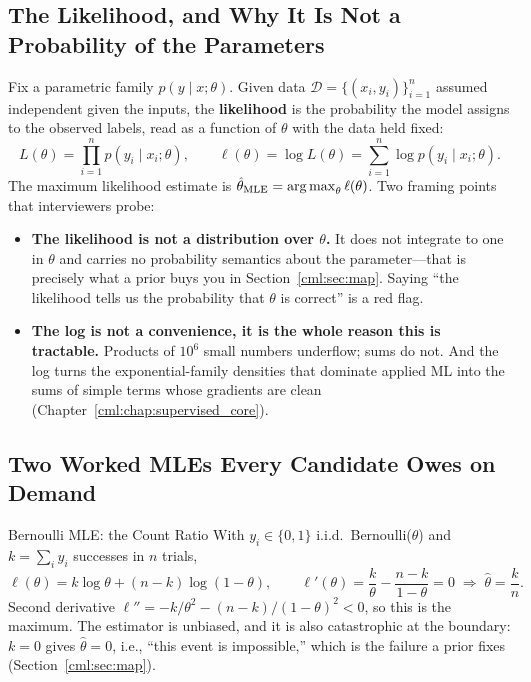 \subsection{The Likelihood, and Why It Is Not a Probability of the Parameters}

Fix a parametric family $p(y \mid x; \theta)$. Given data $\mathcal{D} = \{(x_i, y_i)\}_{i=1}^n$ assumed independent given the inputs, the \textbf{likelihood} is the probability the model assigns to the observed labels, read as a function of $\theta$ with the data held fixed:
\begin{equation}
L(\theta) = \prod_{i=1}^n p(y_i \mid x_i; \theta), \qquad \ell(\theta) = \log L(\theta) = \sum_{i=1}^n \log p(y_i \mid x_i; \theta).
\end{equation}
The maximum likelihood estimate is $\hat\theta_{\text{MLE}} = \operatorname*{arg\,max}_\theta \ell(\theta)$. Two framing points that interviewers probe:

\begin{itemize}
    \item \textbf{The likelihood is not a distribution over $\theta$.} It does not integrate to one in $\theta$ and carries no probability semantics about the parameter---that is precisely what a prior buys you in Section~\ref{cml:sec:map}. Saying ``the likelihood tells us the probability that $\theta$ is correct'' is a red flag.
    \item \textbf{The log is not a convenience, it is the whole reason this is tractable.} Products of $10^6$ small numbers underflow; sums do not. And the log turns the exponential-family densities that dominate applied ML into the sums of simple terms whose gradients are clean (Chapter~\ref{cml:chap:supervised_core}).
\end{itemize}

\subsection{Two Worked MLEs Every Candidate Owes on Demand}

\begin{mathresult}{Bernoulli MLE: the Count Ratio}
With $y_i \in \{0,1\}$ i.i.d.\ Bernoulli($\theta$) and $k = \sum_i y_i$ successes in $n$ trials,
\begin{equation}
\ell(\theta) = k \log\theta + (n-k)\log(1-\theta), \qquad
\ell'(\theta) = \frac{k}{\theta} - \frac{n-k}{1-\theta} = 0 \;\Longrightarrow\; \hat\theta = \frac{k}{n}.
\end{equation}
Second derivative $\ell'' = -k/\theta^2 - (n-k)/(1-\theta)^2 < 0$, so this is the maximum. The estimator is unbiased, and it is also catastrophic at the boundary: $k=0$ gives $\hat\theta = 0$, i.e., ``this event is impossible,'' which is the failure a prior fixes (Section~\ref{cml:sec:map}).
\end{mathresult}

